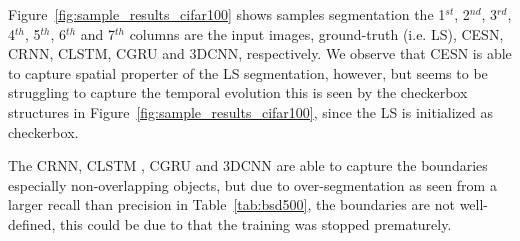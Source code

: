 \documentclass{WitsPhysicsReport}
\begin{document}


\begin{table}[H]
 \centering
 \caption{CIFAR-100 testing results. Here we compare various models and noise is also included.}
    \label{tab:cifar_100}
\end{table}

Figure~\ref{fig:sample_results_cifar100} shows samples segmentation the 1$^{st}$, 2$^{nd}$, 3$^{rd}$, 4$^{th}$, 5$^{th}$, 6$^{th}$ and 7$^{th}$ columns are the input images, ground-truth (i.e. LS), CESN, CRNN, CLSTM, CGRU and 3DCNN, respectively. We observe that CESN is able to capture spatial properter of the LS segmentation, however, but seems to be struggling to capture the temporal evolution this is seen by the checkerbox structures in Figure~\ref{fig:sample_results_cifar100}, since the LS is initialized as checkerbox. 

The CRNN, CLSTM , CGRU and 3DCNN are able to capture the boundaries especially non-overlapping objects, but due to over-segmentation as seen from a larger recall than precision in Table~\ref{tab:bsd500}, the boundaries are not well-defined, this could be due to that the training was stopped prematurely.
\end{document}
